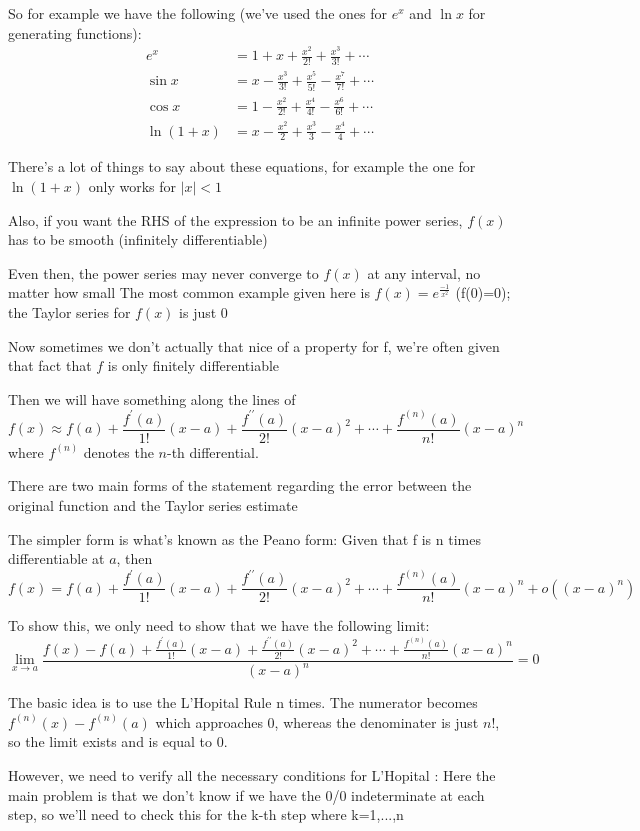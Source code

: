 So for example we have the following (we've used the ones for $e^x$ and $\ln x$ for generating functions):
\begin{align*}
e^x &= 1+x+\frac{x^2}{2!}+\frac{x^3}{3!}+\cdots \\
\sin x &= x-\frac{x^3}{3!}+\frac{x^5}{5!}-\frac{x^7}{7!}+\cdots \\
\cos x &= 1-\frac{x^2}{2!}+\frac{x^4}{4!}-\frac{x^6}{6!}+\cdots \\
\ln(1+x) &= x-\frac{x^2}{2}+\frac{x^3}{3}-\frac{x^4}{4}+\cdots
\end{align*}

There's a lot of things to say about these equations, for example the one for $\ln(1+x)$ only works for $|x|<1$

Also, if you want the RHS of the expression to be an infinite power series, $f(x)$ has to be smooth (infinitely differentiable)

Even then, the power series may never converge to $f(x)$ at any interval, no matter how small
The most common example given here is $f(x)=e^\frac{-1}{x^2}$ (f(0)=0); the Taylor series for $f(x)$ is just $0$

Now sometimes we don't actually that nice of a property for f, we're often given that fact that $f$ is only finitely differentiable

Then we will have something along the lines of
\[ f(x)\approx f(a)+\frac{f^\prime(a)}{1!}(x-a)+\frac{f^{\prime\prime}(a)}{2!}(x-a)^2+\cdots+\frac{f^{(n)}(a)}{n!}(x-a)^n \]
where $f^{(n)}$ denotes the $n$-th differential.

There are two main forms of the statement regarding the error between the original function and the Taylor series estimate

The simpler form is what's known as the Peano form: Given that f is n times differentiable at $a$, then
\[ f(x)=f(a)+\frac{f^\prime(a)}{1!}(x-a)+\frac{f^{\prime\prime}(a)}{2!}(x-a)^2+\cdots+\frac{f^{(n)}(a)}{n!}(x-a)^n+o((x-a)^n) \]

To show this, we only need to show that we have the following limit:
\[ \lim_{x\to a}\frac{f(x)-{f(a)+\frac{f^\prime(a)}{1!}(x-a)+\frac{f^{\prime\prime}(a)}{2!}(x-a)^2+\cdots+\frac{f^{(n)}(a)}{n!}(x-a)^n}}{(x-a)^n}=0 \]

The basic idea is to use the L'Hopital Rule n times. The numerator becomes $f^{(n)}(x)-f^{(n)}(a)$ which approaches $0$, whereas the denominater is just $n!$, so the limit exists and is equal to $0$.

However, we need to verify all the necessary conditions for L'Hopital
:
Here the main problem is that we don't know if we have the 0/0 indeterminate at each step, so we'll need to check this for the k-th step where k=1,...,n

